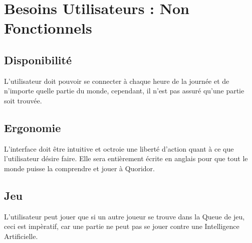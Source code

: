 \section{Besoins Utilisateurs : Non Fonctionnels}
	\subsection{Disponibilité}
	
		L'utilisateur doit pouvoir se connecter à chaque heure de la journée et de n'importe quelle partie du monde, 
		cependant, il n'est pas assuré qu'une partie soit trouvée. 

	\subsection{Ergonomie}
		L'interface doit être intuitive et octroie une liberté d'action quant à ce que l'utilisateur désire faire.
		Elle sera entièrement écrite en anglais pour que tout le monde puisse la comprendre et jouer à Quoridor.

	\subsection{Jeu}
		L'utilisateur peut jouer que si un autre joueur se trouve dans la Queue de jeu, ceci est impèratif,	car une partie ne peut pas se jouer 
		contre une Intelligence Artificielle. 